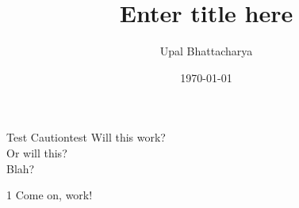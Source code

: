 \documentclass[a4paper]{article}
\author{Upal Bhattacharya}
\date{\today}
\title{Enter title here}
\begin{document}
\maketitle

\listoftodos

\linenumbers

\begin{caution}{Test Caution}{test}
  Will this work? \\
  Or will this? \\
  Blah?
\end{caution}


\begin{upal}{}{1}
  Come on, work!
\end{upal}


\end{document}
